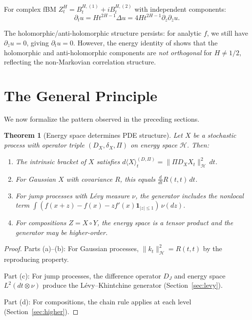 \documentclass[11pt]{article}
\newtheorem{theorem}{Theorem}[section]
\theoremstyle{definition}
\newcommand{\Hi}{\mathcal{H}}
\begin{document}
For complex fBM $Z^H_t = B^{H,(1)}_t + iB^{H,(2)}_t$ with independent components:
\begin{equation}
\partial_t u = Ht^{2H-1}\Delta u = 4Ht^{2H-1}\partial_z\partial_{\bar{z}} u.
\end{equation}

The holomorphic/anti-holomorphic structure persists: for analytic $f$, we still have $\partial_{\bar{z}} u = 0$, giving $\partial_t u = 0$. However, the energy identity of \cite[Proposition 7.6]{PaperV} shows that the holomorphic and anti-holomorphic components are \emph{not orthogonal} for $H \neq 1/2$, reflecting the non-Markovian correlation structure.

\section{The General Principle}\label{sec:general}

We now formalize the pattern observed in the preceding sections.

\begin{theorem}[Energy space determines PDE structure]\label{thm:general-principle}
Let $X$ be a stochastic process with operator triple $(D_X, \delta_X, \Pi)$ on energy space $\Hi$. Then:
\begin{enumerate}
\item[(a)] The intrinsic bracket of $X$ satisfies $d\langle X \rangle^{(D,\Pi)}_t = \|\Pi D_X X_t\|^2_\Hi \, dt$.
\item[(b)] For Gaussian $X$ with covariance $R$, this equals $\frac{d}{dt}R(t,t)\,dt$.
\item[(c)] For jump processes with L\'evy measure $\nu$, the generator includes the nonlocal term $\int(f(x+z) - f(x) - zf'(x)\mathbf{1}_{|z|\leq 1})\,\nu(dz)$.
\item[(d)] For compositions $Z = X \circ Y$, the energy space is a tensor product and the generator may be higher-order.
\end{enumerate}
\end{theorem}

\begin{proof}
Parts (a)--(b): For Gaussian processes, $\|k_t\|^2_\Hi = R(t,t)$ by the reproducing property.

Part (c): For jump processes, the difference operator $D_J$ and energy space $L^2(dt \otimes \nu)$ produce the L\'evy--Khintchine generator (Section~\ref{sec:levy}).

Part (d): For compositions, the chain rule applies at each level (Section~\ref{sec:higher}).
\end{proof}
\end{document}

